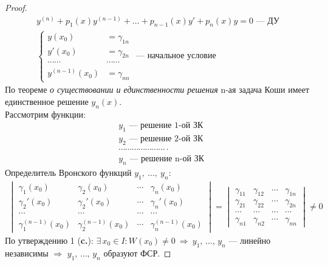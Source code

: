 \begin{proof}
\begin{gather*}
        y^{(n)} + p_1(x)y^{(n-1)} + \ldots + p_{n-1}(x) y' + p_n(x) y = 0\text{ --- ДУ}\\
        \left\{ \begin{aligned}
            y(x_0) &= \gamma_{1n} \\
            y'(x_0) &= \gamma_{2n}\\
            \cdots\cdots&\cdots\cdots \\
            y^{(n-1)}(x_0) &= \gamma_{nn} 
        \end{aligned}\right.\text{ --- начальное условие}
    \end{gather*}
    По теореме \textit{о существовании и единственности решения} n-ая задача Коши имеет единственное решение $y_n(x)$. \\
    Рассмотрим функции:
    \begin{align*}
        &y_1 \text{ --- решение 1-ой ЗК} \\
        &y_2 \text{ --- решение 2-ой ЗК} \\
        &\cdots\cdots\cdots\cdots\cdots\cdots\cdots\cdot \\
        &y_n \text{ --- решение n-ой ЗК} 
    \end{align*}
    Определитель Вронского функций $y_1,\ \ldots,\ y_n\colon$
    \begin{gather*}
        \begin{vmatrix}
            \gamma_{1}(x_0) & \gamma_{2}(x_0) & \cdots & \gamma_{n}(x_0) \\
            \gamma_{2}'(x_0) & \gamma_{2}'(x_0) & \cdots & \gamma_{n}'(x_0) \\
            \cdots & \cdots & \cdots & \cdots \\
            \gamma_{1}^{(n-1)}(x_0) & \gamma_{2}^{(n-1)}(x_0) & \cdots & \gamma_{n}^{(n-1)}(x_0)
        \end{vmatrix} = \begin{vmatrix}
            \gamma_{11} & \gamma_{12} & \cdots & \gamma_{1n} \\
            \gamma_{21} & \gamma_{22} & \cdots & \gamma_{2n} \\
            \cdots & \cdots & \cdots & \cdots \\
            \gamma_{n1} & \gamma_{n2} & \cdots & \gamma_{nn}
        \end{vmatrix} \ne 0
    \end{gather*}
    По утверждению 1 (\textbf{c.\pageref{утв: 1}}): $\exists\, x_0 \in I\colon W(x_0) \ne 0\ \Rightarrow\ y_1,\,\ldots,\, y_n$ --- линейно независимы $\Rightarrow$ $y_1,\,\ldots,\, y_n$ образуют ФСР.
\end{proof}

